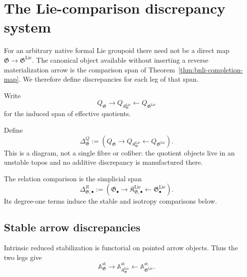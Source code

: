 \section{The Lie-comparison discrepancy system}
\label{sec:bnli-discrepancy}

For an arbitrary native formal Lie groupoid there need not be a direct map
\(\mathfrak G\to\mathfrak G^{\mathrm{Lie}}\).  The canonical object available
without inserting a reverse materialization arrow is the comparison span of
Theorem~\ref{thm:bnli-completion-map}.  We therefore define discrepancies for
each leg of that span.

Write
\[
    Q_{\mathfrak G}
    \longrightarrow
    Q_{\mathfrak K_{\mathfrak G}^{\mathrm{Lie}}}
    \longleftarrow
    Q_{\mathfrak G^{\mathrm{Lie}}}
\]
for the induced span of effective quotients.

\begin{definition}
\label{def:bnli-quotient-discrepancy}
Define
\[
\boxed{
    \Delta^Q_{\mathfrak G}
    :=
    \left(
      Q_{\mathfrak G}
      \longrightarrow
      Q_{\mathfrak K_{\mathfrak G}^{\mathrm{Lie}}}
      \longleftarrow
      Q_{\mathfrak G^{\mathrm{Lie}}}
    \right).}
\]
This is a diagram, not a single fibre or cofiber: the quotient objects live in
an unstable topos and no additive discrepancy is manufactured there.
\end{definition}

\begin{definition}
\label{def:bnli-relation-discrepancy}
The relation comparison is the simplicial span
\[
\boxed{
    \Delta^R_{\mathfrak G,\bullet}
    :=
    \left(
      \mathfrak G_\bullet
      \longrightarrow
      \mathfrak K_{\mathfrak G,\bullet}^{\mathrm{Lie}}
      \longleftarrow
      \mathfrak G^{\mathrm{Lie}}_\bullet
    \right).}
\]
Its degree-one terms induce the stable and isotropy comparisons below.
\end{definition}

\subsection{Stable arrow discrepancies}

Intrinsic reduced stabilization is functorial on pointed arrow objects.  Thus
the two legs give
\[
    \mathbb A^{\mathrm{st}}_{\mathfrak G}
    \longrightarrow
    \mathbb A^{\mathrm{st}}_{\mathfrak K_{\mathfrak G}^{\mathrm{Lie}}}
    \longleftarrow
    \mathbb A^{\mathrm{st}}_{\mathfrak G^{\mathrm{Lie}}}.
\]

